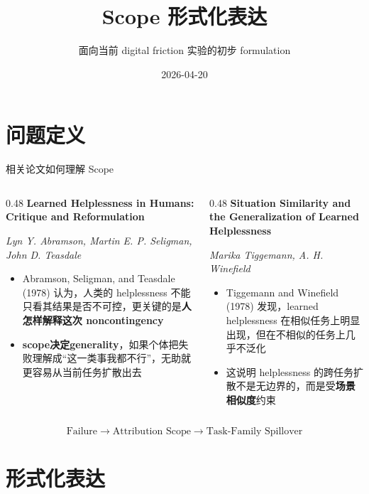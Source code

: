 \documentclass[aspectratio=169]{beamer}
\title[Scope 形式化表达]{Scope 形式化表达}
\subtitle{面向当前 digital friction 实验的初步 formulation}
\date{2026-04-20}
\begin{document}
\begin{frame}
    \titlepage
\end{frame}

\section{问题定义}

\begin{frame}[t]{相关论文如何理解 Scope}
\small
\begin{columns}[T]
\begin{column}{0.48\textwidth}
\textbf{Learned Helplessness in Humans: Critique and Reformulation}

\textit{Lyn Y. Abramson, Martin E. P. Seligman, John D. Teasdale}
\begin{itemize}
    \item Abramson, Seligman, and Teasdale (1978) 认为，人类的 helplessness 不能只看其结果是否不可控，更关键的是\textbf{人怎样解释这次 noncontingency}
    \item \mbox{\textbf{scope决定generality}}，如果个体把失败理解成“这一类事我都不行”，无助就更容易从当前任务扩散出去
\end{itemize}
\end{column}

\begin{column}{0.48\textwidth}
\textbf{Situation Similarity and the Generalization of Learned Helplessness}

\textit{Marika Tiggemann, A. H. Winefield}
\begin{itemize}
    \item Tiggemann and Winefield (1978) 发现，learned helplessness 在相似任务上明显出现，但在不相似的任务上几乎不泛化
    \item 这说明 helplessness 的跨任务扩散不是无边界的，而是受\textbf{场景相似度}约束
\end{itemize}
\end{column}
\end{columns}

\vspace{0.15cm}
\centering
\small
\[
\text{Failure} \rightarrow \text{Attribution Scope} \rightarrow \text{Task-Family Spillover}
\]
\end{frame}

\section{形式化表达}
\end{document}
